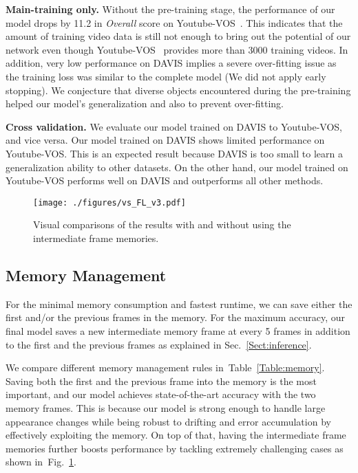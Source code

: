 \documentclass[10pt,twocolumn,letterpaper]{article}
\newcommand{\Tref}[1]{Table~\ref{#1}}
\newcommand{\fref}[1]{Fig.~\ref{#1}}
\newcommand{\sref}[1]{Sec.~\ref{#1}}
\renewcommand{\paragraph}[1]{\vspace{1mm}\noindent\textbf{#1}}
\begin{document}
\paragraph{Main-training only.} 
Without the pre-training stage, the performance of our model drops by 11.2 in \textit{Overall} score on Youtube-VOS~\cite{xu2018youtube}.
This indicates that the amount of training video data is still not enough to bring out the potential of our network even though Youtube-VOS~\cite{xu2018youtube} provides more than 3000 training videos. 
In addition, very low performance on DAVIS implies a severe over-fitting issue as the training loss was similar to the complete model (We did not apply early stopping). 
We conjecture that diverse objects encountered during the pre-training helped our model's generalization and also to prevent over-fitting.  

\paragraph{Cross validation.}
We evaluate our model trained on DAVIS to Youtube-VOS, and vice versa. 
Our model trained on DAVIS shows limited performance on Youtube-VOS.
This is an expected result because DAVIS is too small to learn a generalization ability to other datasets.
On the other hand, our model trained on Youtube-VOS performs well on DAVIS and outperforms all other methods. 




\begin{figure}
\centering
\texttt{[image: ./figures/vs\_FL\_v3.pdf]}
\caption{Visual comparisons of the results with and without using the intermediate frame memories.}
\label{Fig:vs_FL}
\end{figure}





\subsection{Memory Management} \label{MM}
For the minimal memory consumption and fastest runtime, we can save either the first and/or the previous frames in the memory. For the maximum accuracy, our final model saves a new intermediate memory frame at every 5 frames in addition to the first and the previous frames as explained in \sref{Sect:inference}.

We compare different memory management rules in~\Tref{Table:memory}. 
Saving both the first and the previous frame into the memory is the most important, and our model achieves state-of-the-art accuracy with the two memory frames. This is because our model is strong enough to handle large appearance changes while being robust to drifting and error accumulation by effectively exploiting the memory.
On top of that, having the intermediate frame memories further boosts performance by tackling extremely challenging cases as shown in~\fref{Fig:vs_FL}.
\end{document}
